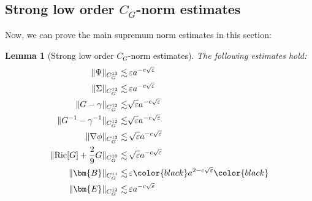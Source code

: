 \documentclass[11pt,leqno,textwidth=10cm]{amsart}
\numberwithin{equation}{section}
\theoremstyle{definition}
\theoremstyle{plain}
\newtheorem{lemma}[definition]{Lemma}
\newcommand{\1}{\mathbbm{1}}
\newcommand{\Ric}{\text{\normalfont{Ric}}}
\renewcommand{\epsilon}{\varepsilon}
\newcommand{\RE}{\bm{E}}
\newcommand{\RB}{\bm{B}}
\newcommand{\change}[1]{\color{black}#1\color{black}}
\begin{document}
\subsection{Strong low order $C_G$-norm estimates}\label{subsec:AP}

Now, we can prove the main supremum norm estimates in this section:

\begin{lemma}[Strong low order $C_G$-norm estimates]\label{lem:AP} The following estimates hold:
\begin{subequations}
\begin{align}
\|\Psi\|_{C^{13}_G}\lesssim&\,\epsilon a^{-c\sqrt{\epsilon}}\,\label{eq:APmidPsi}\\
\|\Sigma\|_{C^{12}_G}\lesssim&\,\epsilon a^{-c\sqrt{\epsilon}}\,\label{eq:APmidSigma}\\
\|G-\gamma\|_{C^{12}_G}\lesssim&\sqrt{\epsilon}a^{-c\sqrt{\epsilon}}\,\label{eq:APmidG}\\
\|G^{-1}-\gamma^{-1}\|_{C^{12}_G}\lesssim&\sqrt{\epsilon}a^{-c\sqrt{\epsilon}}\,\label{eq:APmidG-1}\\
\|\nabla\phi\|_{C^{12}_G}\lesssim&\,\sqrt{\epsilon}a^{-c\sqrt{\epsilon}}\label{eq:APmidphi}\\
\|\Ric[G]+\frac29G\|_{C^{10}_G}\lesssim&\,\sqrt{\epsilon}a^{-c\sqrt{\epsilon}}\label{eq:APmidRic}\\
\|\RB\|_{C^{11}_G}\lesssim&\,\epsilon \change{a^{2-c\sqrt{\epsilon}}}\label{eq:APmidB}\\
\|\RE\|_{C^{12}_G}\lesssim&\,\epsilon a^{-c\sqrt{\epsilon}}\label{eq:APmidE}
\end{align}
\end{subequations}
\end{lemma}
\end{document}
